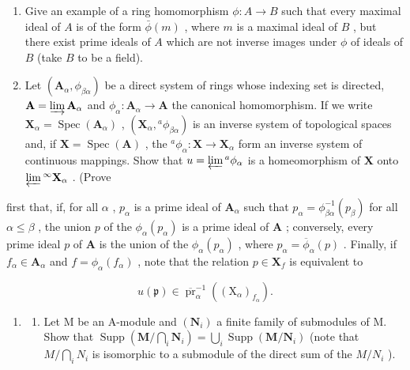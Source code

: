 \begin{enumerate}
\def\labelenumi{\arabic{enumi}.}
\setcounter{enumi}{19}
\item
  Give an example of a ring homomorphism \(\phi: A \to B\) such that every maximal ideal of \(A\) is of the form \(\bar{\phi}(m)\) , where \(m\) is a maximal ideal of \(B\) , but there exist prime ideals of \(A\) which are not inverse images under \(\phi\) of ideals of \(B\) (take \(B\) to be a field).
\item
  Let \((\mathbf{A}_{\alpha}, \phi_{\beta \alpha})\) be a direct system of rings whose indexing set is directed, \(\mathbf{A} = \varinjlim \mathbf{A}_{\alpha}\) and \(\phi_{\alpha}: \mathbf{A}_{\alpha} \to \mathbf{A}\) the canonical homomorphism. If we write \(\mathbf{X}_{\alpha} = \operatorname{Spec}(\mathbf{A}_{\alpha})\) , \((\mathbf{X}_{\alpha}, {}^{a}\phi_{\beta \alpha})\) is an inverse system of topological spaces and, if \(\mathbf{X} = \operatorname{Spec}(\mathbf{A})\) , the \({}^{a}\phi_{\alpha}: \mathbf{X} \to \mathbf{X}_{\alpha}\) form an inverse system of continuous mappings. Show that \(u = \varprojlim {}^{a}\phi_{\alpha}\) is a homeomorphism of \(\mathbf{X}\) onto \(\varprojlim {}^{\infty}\mathbf{X}_{\alpha}\) . (Prove
\end{enumerate}

first that, if, for all \(\alpha\) , \(p_{\alpha}\) is a prime ideal of \(\mathbf{A}_{\alpha}\) such that \(p_{\alpha} = \phi_{\beta \alpha}^{-1}(p_{\beta})\) for all \(\alpha \leqslant \beta\) , the union \(p\) of the \(\phi_{\alpha}(p_{\alpha})\) is a prime ideal of \(\mathbf{A}\) ; conversely, every prime ideal \(p\) of \(\mathbf{A}\) is the union of the \(\phi_{\alpha}(p_{\alpha})\) , where \(p_{\alpha} = \overline{\phi}_{\alpha}(p)\) . Finally, if \(f_{\alpha} \in \mathbf{A}_{\alpha}\) and \(f = \phi_{\alpha}(f_{\alpha})\) , note that the relation \(p \in \mathbf{X}_f\) is equivalent to

\[
u (\mathfrak {p}) \in \overline {{\operatorname{pr}}} _ {\alpha} ^ {- 1} ((\mathrm{X} _ {\alpha}) _ {f _ {\alpha}}).
\]

\begin{enumerate}
\def\labelenumi{\arabic{enumi}.}
\setcounter{enumi}{21}
\tightlist
\item
  \begin{enumerate}
  \def\labelenumii{(\alph{enumii})}
  \tightlist
  \item
    Let M be an A-module and \((\mathbf{N}_{i})\) a finite family of submodules of M. Show that \(\operatorname{Supp}\left(\mathbf{M}/\bigcap_{i}\mathbf{N}_{i}\right)=\bigcup_{i}\operatorname{Supp}(\mathbf{M}/\mathbf{N}_{i})\) (note that \(M/\bigcap_{i}N_{i}\) is isomorphic to a submodule of the direct sum of the \(M/N_{i}\) ).
  \end{enumerate}
\end{enumerate}

